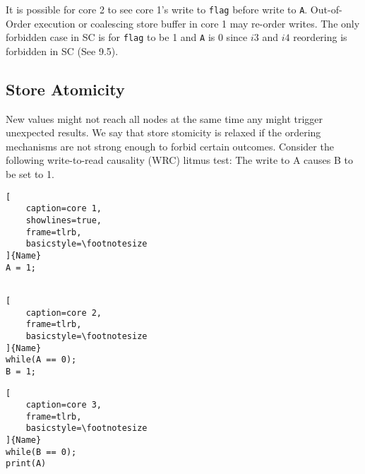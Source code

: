 \documentclass{article}
\begin{document}
\begin{multicols*}{2}
\noindent\newline
It is possible for core 2 to see core 1's write to \texttt{flag} before write to \texttt{A}. Out-of-Order execution or coalescing store buffer in core 1 may re-order writes. The only forbidden case in SC is for \texttt{flag} to be 1 and \texttt{A} is 0 since $i3$ and $i4$ reordering is forbidden in SC (See 9.5).

\subsection{Store Atomicity}
New values might not reach all nodes at the same time any might trigger unexpected results. We say that store stomicity is relaxed if the ordering mechanisms are not strong enough to forbid certain outcomes. Consider the following write-to-read causality (WRC) litmus test: The write to A causes B to be set to 1.

\noindent\begin{minipage}{.15\textwidth}
\captionsetup{labelformat=empty}
\begin{lstlisting}[
    caption=core 1,
    showlines=true,
    frame=tlrb, 
    basicstyle=\footnotesize
]{Name}
A = 1;
 
\end{lstlisting}
\end{minipage}\hfill
\begin{minipage}{.15\textwidth}
\captionsetup{labelformat=empty}
\begin{lstlisting}[
    caption=core 2,
    frame=tlrb,
    basicstyle=\footnotesize
]{Name}
while(A == 0);
B = 1;
\end{lstlisting}
\end{minipage}\hfill
\begin{minipage}{.15\textwidth}
\captionsetup{labelformat=empty}
\begin{lstlisting}[
    caption=core 3,
    frame=tlrb,
    basicstyle=\footnotesize
]{Name}
while(B == 0);
print(A)
\end{lstlisting}
\end{minipage}


\end{multicols*}
\end{document}
